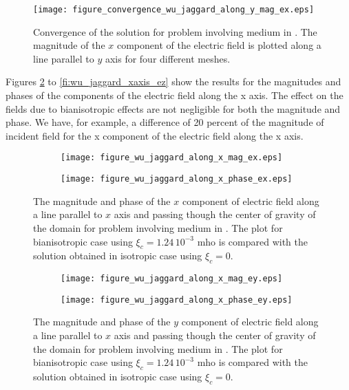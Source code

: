 \begin{figure}
\texttt{[image: figure\_convergence\_wu\_jaggard\_along\_y\_mag\_ex.eps]}
\caption{Convergence of the solution for problem involving medium in \cite{wujaggard}.
The magnitude of the $x$ component of the electric field is plotted 
along a line parallel to $y$ axis for four different meshes.}
\label{fi:wu_jaggard_convergence}
\end{figure}

Figures  \ref{fi:wu_jaggard_xaxis_ex} to \ref{fi:wu_jaggard_xaxis_ez} show the 
results for the magnitudes and phases of the components of the electric field along
the x axis.
The effect on the fields due to bianisotropic effects are not negligible 
for both the magnitude and phase.
We have, for example, a difference of 20 percent of the magnitude of 
incident field for the x component of the electric field along the x axis. 

\begin{figure}
\centering
\begin{subfigure}[b]{0.49\textwidth}
\texttt{[image: figure\_wu\_jaggard\_along\_x\_mag\_ex.eps]}
\end{subfigure}
%
\begin{subfigure}[b]{0.49\textwidth}
\centering
\texttt{[image: figure\_wu\_jaggard\_along\_x\_phase\_ex.eps]}
\end{subfigure}
\caption{The magnitude and phase of the $x$ component of electric field along a line parallel to $x$ axis 
and passing though the center of gravity of the domain for problem involving 
medium in \cite{wujaggard}. 
The plot for bianisotropic case  using $\xi_c = 1.24\,10^{-3}$ mho is compared with 
the solution obtained in isotropic case using $\xi_c = 0$.}
\label{fi:wu_jaggard_xaxis_ex}
\end{figure}

\begin{figure}
\centering
\begin{subfigure}[b]{0.49\textwidth}
\texttt{[image: figure\_wu\_jaggard\_along\_x\_mag\_ey.eps]}
\end{subfigure}
%
\begin{subfigure}[b]{0.49\textwidth}
\centering
\texttt{[image: figure\_wu\_jaggard\_along\_x\_phase\_ey.eps]}
\end{subfigure}
\caption{The magnitude and phase of the $y$ component of electric field along a line parallel to $x$ axis 
and passing though the center of gravity of the domain for problem involving 
medium in \cite{wujaggard}. 
The plot for bianisotropic case  using $\xi_c = 1.24\,10^{-3}$ mho is compared with 
the solution obtained in isotropic case using $\xi_c = 0$.}
\label{fi:wu_jaggard_xaxis_ey}
\end{figure}

